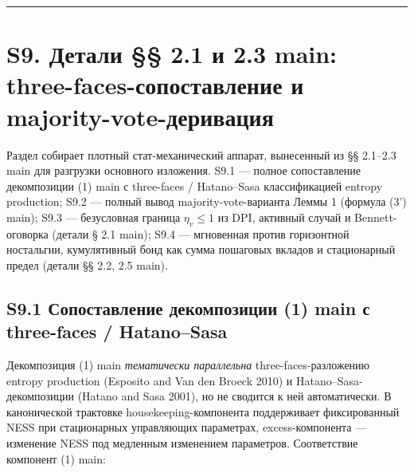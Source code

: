 \documentclass[pdflatex,sn-mathphys-ay]{sn-jnl}
\begin{document}
\begin{center}\rule{0.5\linewidth}{0.5pt}\end{center}



\section*{S9. Детали §§ 2.1 и 2.3 main: three-faces-сопоставление и majority-vote-деривация}\label{s9.-ux434ux435ux442ux430ux43bux438-2.1-ux438-2.3-main-three-faces-ux441ux43eux43fux43eux441ux442ux430ux432ux43bux435ux43dux438ux435-ux438-majority-vote-ux434ux435ux440ux438ux432ux430ux446ux438ux44f}



Раздел собирает плотный стат-механический аппарат, вынесенный из §§ 2.1--2.3 main для разгрузки основного изложения. S9.1 --- полное сопоставление декомпозиции (1) main с three-faces / Hatano--Sasa классификацией entropy production; S9.2 --- полный вывод majority-vote-варианта Леммы 1 (формула (3') main); S9.3 --- безусловная граница \(\eta_v \le 1\) из DPI, активный случай и Bennett-оговорка (детали § 2.1 main); S9.4 --- мгновенная против горизонтной ностальгии, кумулятивный бонд как сумма пошаговых вкладов и стационарный предел (детали §§ 2.2, 2.5 main).



\subsection*{S9.1 Сопоставление декомпозиции (1) main с three-faces / Hatano--Sasa}\label{s9.1-ux441ux43eux43fux43eux441ux442ux430ux432ux43bux435ux43dux438ux435-ux434ux435ux43aux43eux43cux43fux43eux437ux438ux446ux438ux438-1-main-ux441-three-faces-hatanosasa}



Декомпозиция (1) main \emph{тематически параллельна} three-faces-разложению entropy production (Esposito and Van den Broeck 2010) и Hatano--Sasa-декомпозиции (Hatano and Sasa 2001), но не сводится к ней автоматически. В канонической трактовке housekeeping-компонента поддерживает фиксированный NESS при стационарных управляющих параметрах, excess-компонента --- изменение NESS под медленным изменением параметров. Соответствие компонент (1) main:
\end{document}
